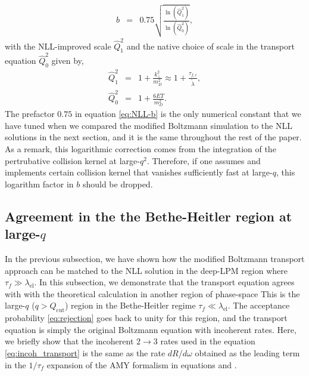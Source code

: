 \documentclass[aps, prc, reprint, amsmath, groupedaddress, nofootinbib]{revtex4-1}
\begin{document}
\begin{eqnarray}
b &=& 0.75\sqrt{\frac{\ln(\hat{Q}_1^2 )}{\ln(\hat{Q}_0^2 )}},
\label{eq:NLL-b}
\end{eqnarray}
with the NLL-improved scale $\hat{Q}_1^2$ and the native choice of scale in the transport equation $\hat{Q}_0^2$ given by,
\begin{eqnarray}
\hat{Q}_1^2 &=& 1 + \frac{k_\perp^2}{m_D^2} \approx 1 + \frac{\tau_{f,i}}{\tilde{\lambda}}, \\ 
\hat{Q}_0^2 &=& 1 + \frac{6ET}{m_D^2}.
\end{eqnarray}
The prefactor $0.75$ in equation \ref{eq:NLL-b} is the only numerical constant that we have tuned when we compared the modified Boltzmann simulation to the NLL solutions in the next section, and it is the same throughout the rest of the paper.
As a remark, this logarithmic correction comes from the integration of the pertrubative collision kernel at large-$q^2$.
Therefore, if one assumes and implements certain collision kernel that vanishes sufficiently fast at large-$q$, this logarithm factor in $b$ should be dropped. 

\subsection{Agreement in the the Bethe-Heitler region at large-$q$}
In the previous subsection, we have shown how the modified Boltzmann transport approach can be matched to the NLL solution in the deep-LPM region where $\tau_f \gg \lambda_{\textrm{el}}$.
In this subsection, we demonstrate that the transport equation agrees with  with the theoretical calculation in another region of phase-space
This is the large-$q$ ($q>Q_{\textrm{cut}}$) region in the Bethe-Heitler regime $\tau_f \ll \lambda_{\textrm{el}}$.
The acceptance probability \ref{eq:rejection} goes back to unity for this region, and the transport equation is simply the original Boltzmann equation with incoherent rates.
Here, we briefly show that the incoherent $2\rightarrow 3$ rates used in the equation \ref{eq:incoh_transport} is the same as the rate $dR/d\omega$ obtained as the leading term in the $1/\tau_f$ expansion of the AMY formalism in equations \label{eq:AMY-1} and \label{eq:AMY-2}.
\end{document}
